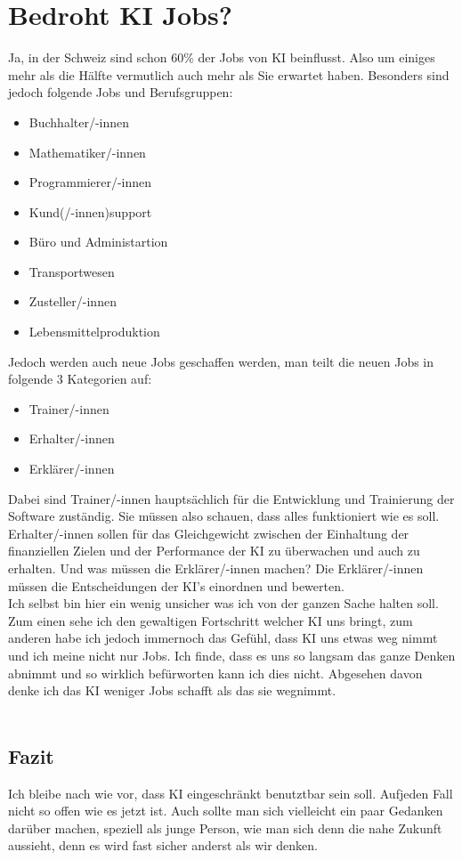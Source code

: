 \chapter{Bedroht KI Jobs?}
Ja, in der Schweiz sind schon 60\% der Jobs von KI beinflusst. Also um einiges mehr als die Hälfte vermutlich auch mehr als Sie erwartet haben. Besonders sind jedoch folgende Jobs und Berufsgruppen:
\begin{itemize}
    \item Buchhalter/-innen
    \item Mathematiker/-innen
    \item Programmierer/-innen
    \item Kund(/-innen)support
    \item Büro und Administartion
    \item Transportwesen
    \item Zusteller/-innen
    \item Lebensmittelproduktion
\end{itemize}
Jedoch werden auch neue Jobs geschaffen werden, man teilt die neuen Jobs in folgende 3 Kategorien auf:
\begin{itemize}
    \item Trainer/-innen
    \item Erhalter/-innen
    \item Erklärer/-innen
\end{itemize}
Dabei sind Trainer/-innen hauptsächlich für die Entwicklung und Trainierung der Software zuständig. Sie müssen also schauen, dass alles funktioniert wie es soll.
Erhalter/-innen sollen für das Gleichgewicht zwischen der Einhaltung der finanziellen Zielen und der Performance der KI zu überwachen und auch zu erhalten.
Und was müssen die Erklärer/-innen machen? Die Erklärer/-innen müssen die Entscheidungen der KI's einordnen und bewerten.\citep{bedrohte-jobs-kununu}
\\
Ich selbst bin hier ein wenig unsicher was ich von der ganzen Sache halten soll. Zum einen sehe ich den  gewaltigen Fortschritt welcher KI uns bringt, zum anderen habe ich jedoch immernoch das Gefühl,
dass KI uns etwas weg nimmt und ich meine nicht nur Jobs. Ich finde, dass es uns so langsam das ganze Denken abnimmt und so wirklich befürworten kann ich dies nicht. Abgesehen davon denke ich das KI weniger Jobs schafft als das sie wegnimmt.
\\
\\
\section{Fazit}
Ich bleibe nach wie vor, dass KI eingeschränkt benutztbar sein soll. Aufjeden Fall nicht so offen wie es jetzt ist. Auch sollte man sich vielleicht ein paar Gedanken darüber machen, speziell als junge Person, wie man sich denn die nahe Zukunft aussieht, denn es wird fast sicher anderst als wir denken.
